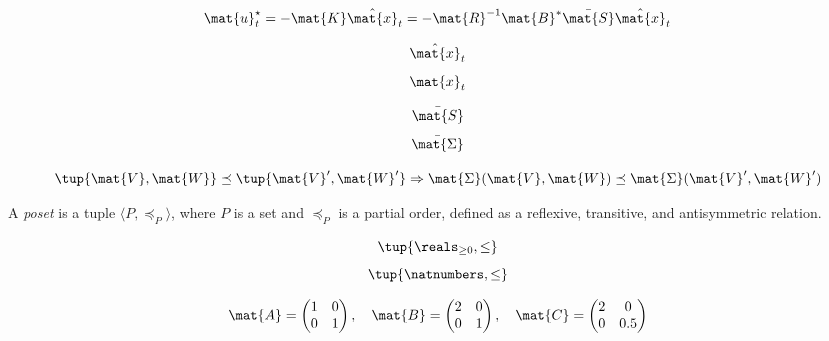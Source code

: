 {\begin{forslides}
        \begin{equation*}
            \label{eq:optimal_control}
            \mat{u}_t^\star =-\mat{K}\hat{\mat{x}}_t=-\mat{R}^{-1}\mat{B}^*\bar{\mat{S}}\hat{\mat{x}}_t
        \end{equation*}

        \begin{equation*}
            \label{eq:x_estimate}
            \hat{\mat{x}}_t
        \end{equation*}
        \begin{equation*}
            \label{eq:x_real}
            \mat{x}_t
        \end{equation*}

        \begin{equation*}
            \label{eq:ric_1}
            \bar{\mat{S}}
        \end{equation*}
        \begin{equation*}
            \label{eq:ric_2}
            \bar{\mat{\Sigma}}
        \end{equation*}

        \begin{equation*}
            \label{eq:mon_est}
            \tup{\mat{V},\mat{W}}\preceq \tup{\mat{V}',\mat{W}'} \Rightarrow \mat{\Sigma}(\mat{V},\mat{W})\preceq \mat{\Sigma}(\mat{V}',\mat{W}')
        \end{equation*}

        \begin{definition}
            \label{def:poset_cont}
            A \emph{poset} is a tuple $\langle P,\preceq_P\rangle$, where $P$ is a set and $\preceq_P$ is a partial order, defined as a reflexive, transitive, and antisymmetric relation.
        \end{definition}

        \begin{equation*}
            \label{eq:posreals}
            \tup{\reals_{\geq 0},\leq}
        \end{equation*}
        \begin{equation*}
            \label{eq:nats}
            \tup{\natnumbers,\leq}
        \end{equation*}

        \begin{equation*}
            \label{eq:matrix_poset}
            \mat{A}=\begin{pmatrix}
                        1& 0\\0& 1
            \end{pmatrix}, \quad \mat{B}=\begin{pmatrix}
                                             2& 0\\0& 1
            \end{pmatrix},\quad \mat{C}=\begin{pmatrix}
                                            2& 0\\0& 0.5
            \end{pmatrix}
        \end{equation*}


\end{forslides}}
